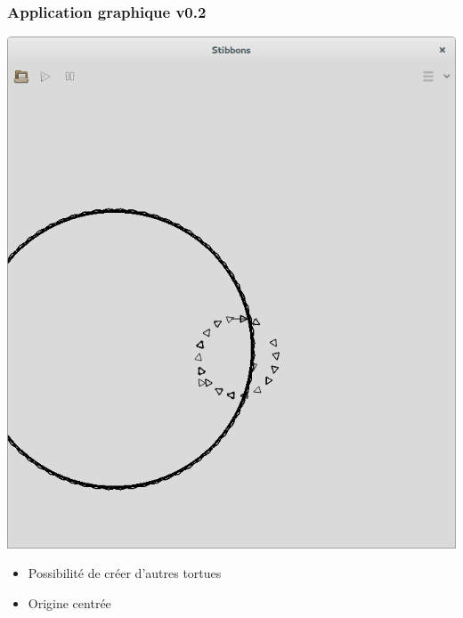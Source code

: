 \begin{frame}
\frametitle{Application graphique v0.2}
\begin{center}
\includegraphics[scale=0.16]{doc/Presentation/screenshot/stibbons-0-2-2.png}
\end{center}

\begin{itemize}
	\item Possibilité de créer d'autres tortues
	\item Origine centrée
\end{itemize}
\end{frame}

